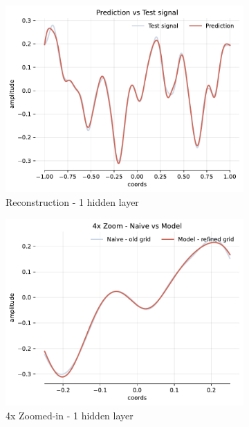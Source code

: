 \begin{figure}[!h]
    \begin{subfigure}[b]{0.32\textwidth}
        \centering
        \includegraphics[width=\textwidth]{img/ch3/pred-8hf-1hl-2w-sub6.pdf}
        \caption{Reconstruction - 1 hidden layer}
    \end{subfigure}
    \begin{subfigure}[b]{0.32\textwidth}
        \centering
        \includegraphics[width=\textwidth]{img/ch3/4x-8hf-1hl-2w-sub6.pdf}
        \caption{4x Zoomed-in - 1 hidden layer}
    \end{subfigure}
    \begin{subfigure}[b]{0.32\textwidth}

\end{subfigure}
\end{figure}

